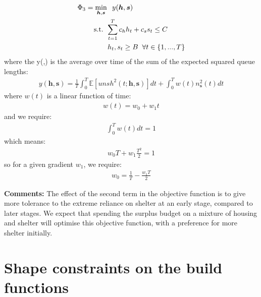 \documentclass{article}
\begin{document}
\begin{align*}
        & \Phi_3 = \min_{\boldsymbol{h},\boldsymbol{s}} \hspace{0.2cm} y(\boldsymbol{h},\boldsymbol{s}) \\
        & \hspace{0.7cm} \text{ s.t. } \sum_{t=1}^{T} c_{h}h_{t} + c_{s}s_{t} \leq C \\
        & \hspace{1.5cm} h_t, s_t \geq B \hspace{0.2cm} \forall t \in \{1, ..., T\}
\end{align*}
%
where the y(,) is the average over time of the sum of the expected squared queue lengths: 
\begin{align*}
  y(\boldsymbol{h},\boldsymbol{s}) = \frac{1}{T} \int_0^T \mathbb{E}[unsh^2(t; \boldsymbol{h},\boldsymbol{s})] dt + \int_0^T w(t) n_{\boldsymbol{s}}^2(t) dt
\end{align*}
%
where $w(t)$ is a linear function of time: 
%
\begin{align*}
w(t) = w_0 + w_1 t
\end{align*}
and we require:
%
\begin{align*}
\int_0^T w(t) dt = 1
\end{align*}
which means: 
% 
\begin{align*}
w_0T + w_1\frac{T^2}{2} = 1
\end{align*}
so for a given gradient $w_1$, we require: 
\begin{align*}
w_0 = \frac{1}{T} - \frac{w_1T}{2}
\end{align*}

\textbf{Comments:} The effect of the second term in the objective function is to give more tolerance to the extreme reliance on shelter at an early stage, compared to later stages. We expect that spending the surplus budget on a mixture of housing and shelter will optimise this objective function, with a preference for more shelter initially. 

\newpage

\section{Shape constraints on the build functions}
\end{document}
